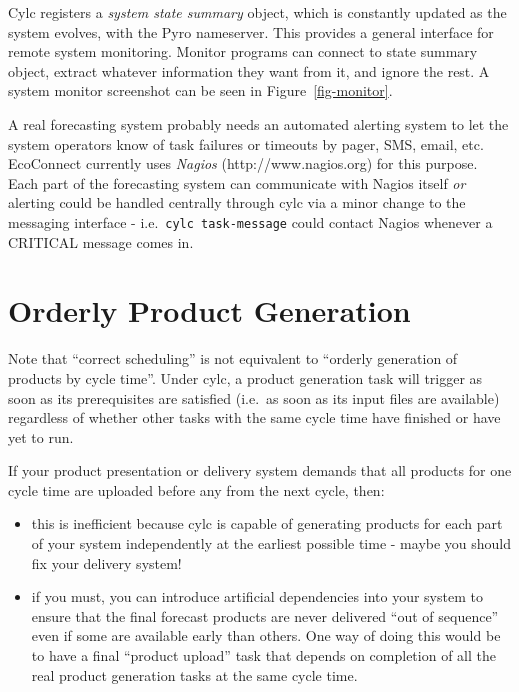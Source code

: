 \documentclass[11pt,a4paper]{article}
\begin{document}
Cylc registers a {\em system state summary} object, which is constantly
updated as the system evolves, with the Pyro nameserver. This provides a
general interface for remote system monitoring. Monitor programs can
connect to state summary object, extract whatever information they want
from it, and ignore the rest. A system monitor screenshot can be seen in
Figure~\ref{fig-monitor}.

A real forecasting system probably needs an automated alerting system
to let the system operators know of task failures or timeouts by pager,
SMS, email, etc.  EcoConnect currently uses {\em Nagios}
(http://www.nagios.org) for this purpose. Each part of the forecasting
system can communicate with Nagios itself {\em or} alerting could be
handled centrally through cylc via a minor change to the messaging
interface - i.e.\ \lstinline=cylc task-message= could contact Nagios
whenever a CRITICAL message comes in.

\section{Orderly Product Generation}
\label{OrderlyProductGeneration}

Note that ``correct scheduling'' is not equivalent to ``orderly
generation of products by cycle time''.  Under cylc, a product
generation task will trigger as soon as its prerequisites are satisfied 
(i.e.\ as soon as its input files are available) regardless of
whether other tasks with the same cycle time have finished or have yet
to run. 

If your product presentation or delivery system demands that all
products for one cycle time are uploaded before any from the next
cycle, then:

\begin{itemize}
    \item this is inefficient because cylc is capable of generating products 
        for each part of your system independently at the earliest
        possible time - maybe you should fix your delivery system!
    \item if you must, you can introduce artificial dependencies into
        your system to ensure that the final forecast products are never
        delivered ``out of sequence'' even if some are available early
        than others.  One way of doing this would be to have a final
        ``product upload'' task that depends on completion of all the
        real product generation tasks at the same cycle time.
\end{itemize}
\end{document}
